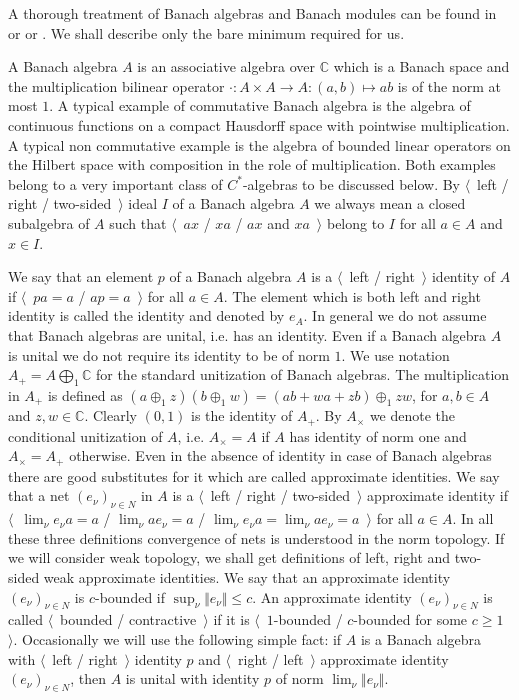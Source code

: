 A thorough treatment of Banach algebras and Banach modules can be found in \cite{HelBanLocConvAlg} or \cite{HelHomolBanTopAlg} or \cite{DalBanAlgAutCont}. We shall describe only the bare minimum required for us.

A Banach algebra $A$ is an associative algebra over $\mathbb{C}$ which is a Banach space and the multiplication bilinear operator $\cdot:A\times A\to A:(a,b)\mapsto ab$ is of the norm at most $1$. A typical example of commutative Banach algebra is the algebra of continuous functions on a compact Hausdorff space with pointwise multiplication. A typical non commutative example is the algebra of bounded linear operators on the Hilbert space with composition in the role of multiplication. Both examples belong to a very important class of $C^*$-algebras to be discussed below. By $\langle$~left / right / two-sided~$\rangle$ ideal $I$ of a Banach algebra $A$ we always mean a closed subalgebra of $A$ such that $\langle$~$ax$ / $xa$ / $ax$ and $xa$~$\rangle$ belong to $I$ for all $a\in A$ and $x\in I$.

We say that an element $p$ of a Banach algebra $A$ is a $\langle$~left / right~$\rangle$ identity of $A$ if $\langle$~$pa=a$ / $ap=a$~$\rangle$ for all $a\in A$. The element which is both left and right identity is called the identity and denoted by $e_A$. In general we do not assume that Banach algebras are unital, i.e. has an identity. Even if a Banach algebra $A$ is unital we do not require its identity to be of norm $1$. We use notation $A_+=A\bigoplus_1\mathbb{C}$ for the standard unitization of Banach algebras. The multiplication in $A_+$ is defined as $(a\oplus_1 z)(b\oplus_1 w)=(ab+wa+zb)\oplus_1 zw$, for $a,b\in A$ and $z,w\in\mathbb{C}$. Clearly $(0,1)$ is the identity of $A_+$. By $A_\times$ we denote the conditional unitization of $A$, i.e. $A_\times=A$ if $A$ has identity of norm one and $A_\times=A_+$ otherwise. Even in the absence of identity in case of Banach algebras there are good substitutes for it which are called approximate identities. We say that a net $(e_\nu)_{\nu\in N}$ in $A$ is a $\langle$~left / right / two-sided~$\rangle$ approximate identity if $\langle$~$\lim_\nu e_\nu a=a$ / $\lim_\nu ae_\nu=a$ / $\lim_\nu e_\nu a=\lim_\nu ae_\nu=a$~$\rangle$ for all $a\in A$. In all these three definitions convergence of nets is understood in the norm topology. If we will consider weak topology, we shall get definitions of left, right and two-sided weak approximate identities. We say that an approximate identity $(e_\nu)_{\nu\in N}$ is $c$-bounded if $\sup_\nu\Vert e_\nu\Vert\leq c$. An approximate identity $(e_\nu)_{\nu\in N}$ is called $\langle$~bounded / contractive~$\rangle$ if it is $\langle$~$1$-bounded / $c$-bounded for some $c\geq 1$~$\rangle$. Occasionally we will use the following simple fact: if $A$ is a Banach algebra with $\langle$~left / right~$\rangle$ identity $p$ and $\langle$~right / left~$\rangle$ approximate identity $(e_\nu)_{\nu\in N}$, then $A$ is unital with identity $p$ of norm $\lim_\nu\Vert e_\nu\Vert$. 

